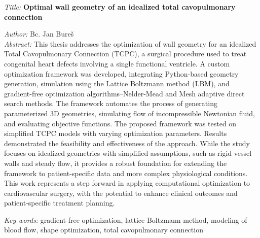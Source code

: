 %
\begin{onehalfspace}
\noindent \emph{Title:}
\noindent \textbf{Optimal wall geometry of an idealized total cavopulmonary connection}
\end{onehalfspace}
\noindent \emph{Author:} Bc. Jan Bureš\\[2pt]
\noindent \emph{Abstract:} This thesis addresses the optimization of wall geometry for an idealized Total Cavopulmonary Connection (TCPC), a surgical procedure used to treat congenital heart defects involving a single functional ventricle. A custom optimization framework was developed, integrating Python-based geometry generation, simulation using the Lattice Boltzmann method (LBM), and gradient-free optimization algorithms--Nelder-Mead and Mesh adaptive direct search methods. The framework automates the process of generating parameterized 3D geometries, simulating flow of incompressible Newtonian fluid, and evaluating objective functions. The proposed framework was tested on simplified TCPC models with varying optimization parameters. Results demonstrated the feasibility and effectiveness of the approach. While the study focuses on idealized geometries with simplified assumptions, such as rigid vessel walls and steady flow, it provides a robust foundation for extending the framework to patient-specific data and more complex physiological conditions. This work represents a step forward in applying computational optimization to cardiovascular surgery, with the potential to enhance clinical outcomes and patient-specific treatment planning.

\bigskip{}

\noindent \emph{Key words:} gradient-free optimization, lattice Boltzmann method, modeling of blood flow, shape optimization, total cavopulmonary connection

